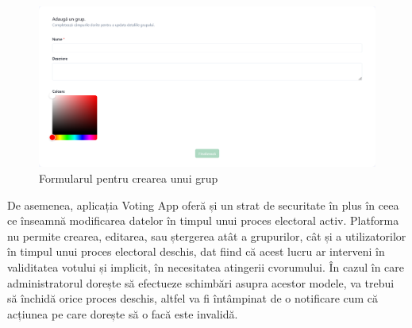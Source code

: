 \begin{figure}[!ht]
    \centering
    \includegraphics[width=140mm]{images/crud_group.png}
    \caption{Formularul pentru crearea unui grup}
\end{figure}

De asemenea, aplicația Voting App oferă și un strat de securitate în plus în ceea ce înseamnă modificarea datelor în timpul unui proces electoral activ. Platforma nu permite crearea, editarea, sau ștergerea atât a grupurilor, cât și a utilizatorilor  în timpul unui proces electoral deschis, dat fiind că acest lucru ar interveni în validitatea votului și implicit, în necesitatea atingerii cvorumului. În cazul în care administratorul dorește să efectueze schimbări asupra acestor modele, va trebui să închidă orice proces deschis, altfel va fi întâmpinat de o notificare cum că acțiunea pe care dorește să o facă este invalidă.

\newpage

